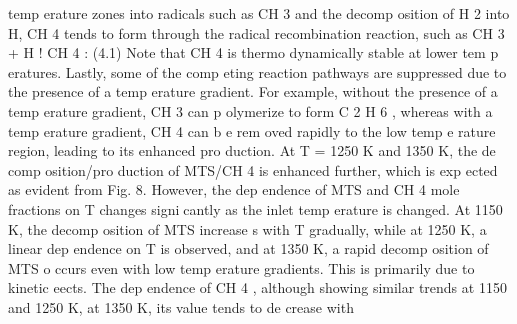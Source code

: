 \documentclass[10pt, letterpaper]{article}
\begin{document}
temp erature zones into radicals such as CH
3
and the decomp osition of H
2
into H, CH
4
tends to form through
the radical recombination reaction, such as
CH
3
+ H
!
CH
4
:
(4.1)
Note that CH
4
is thermo dynamically stable at lower tem p eratures. Lastly, some of the comp eting reaction
pathways are suppressed due to the presence of a temp erature gradient. For example, without the presence
of a temp erature gradient, CH
3
can p olymerize to form C
2
H
6
, whereas with a temp erature gradient, CH
4
can b e rem oved rapidly to the low temp e rature region, leading to its enhanced pro duction.
At
T
= 1250 K and 1350 K, the de comp osition/pro duction of MTS/CH
4
is enhanced further, which is
exp ected as evident from Fig. 8. However, the dep endence of MTS and CH
4
mole fractions on 
T
changes
signicantly as the inlet temp erature is changed. At 1150 K, the decomp osition of MTS increase s with
T
gradually, while at 1250 K, a linear dep endence on
T
is observed, and at 1350 K, a rapid decomp osition of
MTS o ccurs even with low temp erature gradients. This is primarily due to kinetic eects. The dep endence
of CH
4
, although showing similar trends at 1150 and 1250 K, at 1350 K, its value tends to de crease with
\end{document}
